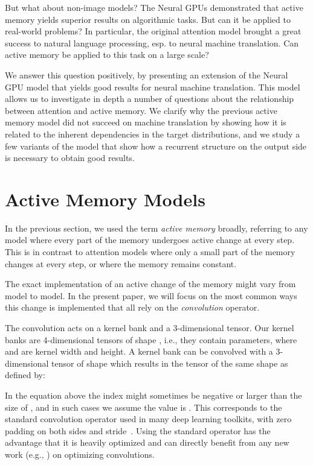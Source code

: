 \documentclass{article}
\begin{document}
But what about non-image models? The Neural GPUs \cite{neural_gpu} demonstrated
that active memory yields superior results on algorithmic tasks.
But can it be applied to real-world problems? In particular, the original
attention model brought a great success to natural language processing,
esp. to neural machine translation.
Can active memory be applied to this task on a large scale?

We answer this question positively, by presenting an extension of
the Neural GPU model that yields good results for neural machine translation.
This model allows us to investigate in depth a number of questions
about the relationship between attention and active memory.
We clarify why the previous active memory model did not succeed
on machine translation by showing how it is related to
the inherent dependencies in the target distributions,
and we study a few variants of the model that show
how a recurrent structure on the output side is necessary to obtain good results.


\section{Active Memory Models} \label{sec:cgrn}

In the previous section, we used the term \emph{active memory} broadly,
referring to any model where every part of the memory
undergoes active change at every step.
This is in contrast to attention models where only
a small part of the memory changes at every step,
or where the memory remains constant.

The exact implementation of an active change of the memory might
vary from model to model. In the present paper, we will focus on
the most common ways this change is implemented that all rely
on the \emph{convolution} operator.

The convolution acts on a kernel bank and a 3-dimensional tensor.
Our kernel banks are 4-dimensional tensors of shape ,
i.e., they contain  parameters,
where  and  are kernel width and height. A kernel bank 
can be convolved with a 3-dimensional tensor  of shape  which
results in the tensor  of the same shape as  defined by:


In the equation above the index  might sometimes be negative
or larger than the size of , and in such cases we assume the value
is . This corresponds to the standard convolution operator used in
many deep learning toolkits, with zero padding on both sides
and stride~. Using the standard operator has the advantage that
it is heavily optimized and can directly benefit from any new work
(e.g., \cite{fastconv}) on optimizing convolutions.
\end{document}
